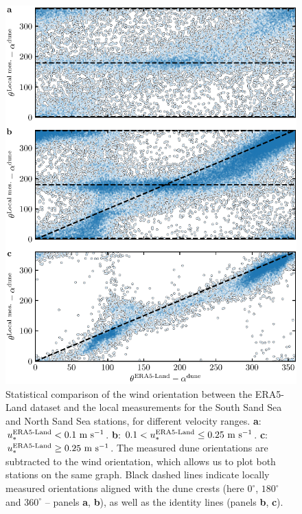 \begin{figure}[p]
\centering
\includegraphics[scale=1]{Figures/Figure6_supp.pdf}
\caption{Statistical comparison of the wind orientation between the ERA5-Land dataset and the local measurements for the South Sand Sea and North Sand Sea stations, for different velocity ranges. \textbf{a}: $u_{*}^{\textup{ERA5-Land}} < 0.1~\textup{m}~\textup{s}^{-1}$. \textbf{b}: $0.1 < u_{*}^{\textup{ERA5-Land}} \leq 0.25~\textup{m}~\textup{s}^{-1}$. \textbf{c}: $u_{*}^{\textup{ERA5-Land}} \geq 0.25~\textup{m}~\textup{s}^{-1}$. The measured dune orientations are subtracted to the wind orientation, which allows us to plot both stations on the same graph. Black dashed lines indicate locally measured orientations aligned with the dune crests (here $0^\circ$, $180^\circ$ and $360^\circ$ -- panels \textbf{a}, \textbf{b}), as well as the identity lines (panels \textbf{b}, \textbf{c}).}
\label{Fig6_supp}
\end{figure}

